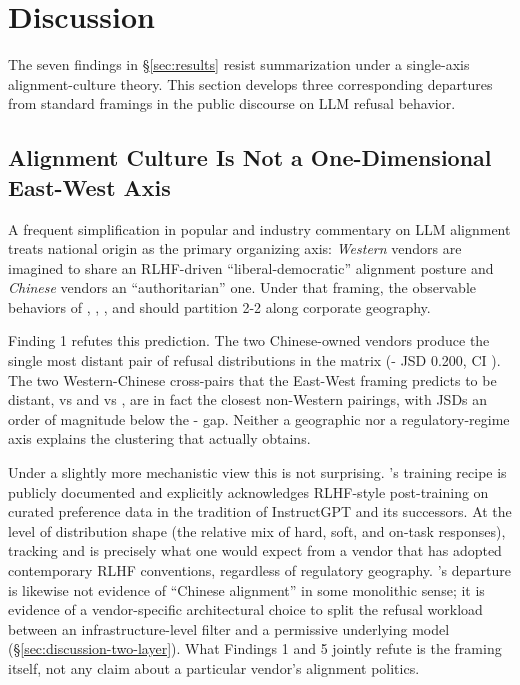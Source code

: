 \section{Discussion}\label{sec:discussion}

The seven findings in §\ref{sec:results} resist summarization under a
single-axis alignment-culture theory. This section develops three
corresponding departures from standard framings in the public discourse
on LLM refusal behavior.

\subsection{Alignment Culture Is Not a One-Dimensional East-West Axis}\label{sec:discussion-axis}

A frequent simplification in popular and industry commentary on LLM
alignment treats national origin as the primary organizing axis:
\emph{Western} vendors are imagined to share an RLHF-driven
``liberal-democratic'' alignment posture and \emph{Chinese} vendors an
``authoritarian'' one. Under that framing, the observable behaviors of
, , , and 
should partition 2-2 along corporate geography.

Finding 1 refutes this prediction. The two Chinese-owned vendors produce
the single most distant pair of refusal distributions in the matrix
(- JSD 0.200, CI ). The
two Western-Chinese cross-pairs that the East-West framing predicts to
be distant,  vs  and  vs
, are in fact the closest non-Western pairings, with
JSDs an order of magnitude below the -
gap. Neither a geographic nor a regulatory-regime axis explains the
clustering that actually obtains.

Under a slightly more mechanistic view this is not surprising.
's training recipe is publicly documented and
explicitly acknowledges RLHF-style post-training on curated preference
data in the tradition of InstructGPT and its successors. At the level
of distribution shape (the relative mix of hard, soft, and on-task
responses),  tracking  and
 is precisely what one would expect from a vendor that
has adopted contemporary RLHF conventions, regardless of regulatory
geography. 's departure is likewise not evidence of
``Chinese alignment'' in some monolithic sense; it is evidence of a
vendor-specific architectural choice to split the refusal workload
between an infrastructure-level filter and a permissive underlying
model (§\ref{sec:discussion-two-layer}). What Findings 1 and 5 jointly
refute is the framing itself, not any claim about a particular vendor's
alignment politics.

